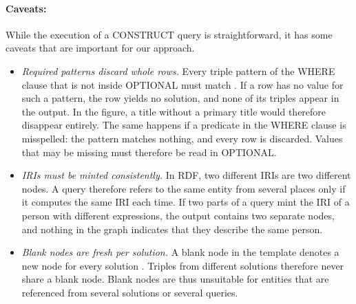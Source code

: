 \paragraph{Caveats:} While the execution of a CONSTRUCT query is straightforward, it has some caveats that are important for our approach.
\begin{itemize}
  \item \emph{Required patterns discard whole rows.} Every triple pattern of the WHERE clause that is not inside OPTIONAL must match \citep{world2013sparql}. If a row has no value for such a pattern, the row yields no solution, and none of its triples appear in the output. In the figure, a title without a primary title would therefore disappear entirely. The same happens if a predicate in the WHERE clause is misspelled: the pattern matches nothing, and every row is discarded. Values that may be missing must therefore be read in OPTIONAL.
  \item \emph{IRIs must be minted consistently.} In RDF, two different IRIs are two different nodes. A query therefore refers to the same entity from several places only if it computes the same IRI each time. If two parts of a query mint the IRI of a person with different expressions, the output contains two separate nodes, and nothing in the graph indicates that they describe the same person.
  \item \emph{Blank nodes are fresh per solution.} A blank node in the template denotes a new node for every solution \citep{world2013sparql}. Triples from different solutions therefore never share a blank node. Blank nodes are thus unsuitable for entities that are referenced from several solutions or several queries.
\end{itemize}
